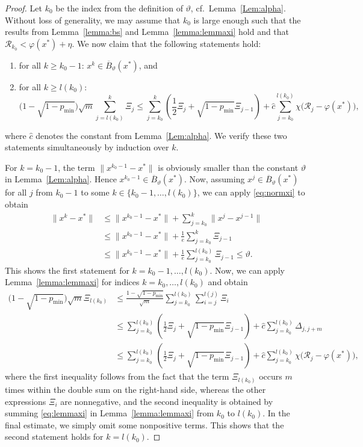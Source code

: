 \documentclass[a4paper, 12pt]{article}
\numberwithin{equation}{section}
\theoremstyle{bolddef}
\theoremstyle{definition}
\theoremstyle{boldplain}
\newcommand{\xk}{x^k}
\newcommand{\xj}{x^j}
\newcommand{\xjm}{x^{j-1}}
\newcommand{\pmin}{p_{\min}}
\newcommand{\Rvalue}{\mathcal{R}}
\newcommand{\clball}{\overline{B}}
\begin{document}
\begin{proof}
Let $k_0$ be the index from the definition of $\vartheta$, cf.\ Lemma~\ref{Lem:alpha}. Without loss of generality, we may assume that $k_0$ is large enough such that the results from Lemma~\ref{lemma:bs} and Lemma~\ref{lemma:lemmaxi} hold and that $\Rvalue_{k_0} < \varphi(x^*) + \eta$. We now claim that the following statements hold:
\begin{enumerate}[label=(\alph*)]
	\item for all $k \geq k_0-1$: $\xk \in \clball_\vartheta(x^*)$, and
	\item for all $k \geq l(k_0)$:
	\begin{equation}\label{eq:statementb}
	\big( 1-\sqrt{1-\pmin} \big) 
		\sqrt{m} \sum_{j = l(k_0)}^k \Xi_j \leq \sum_{j = k_0}^k \left(\frac{1}{2} \Xi_j + \sqrt{1-\pmin} \Xi_{j-1}\right) + \hat c \sum_{j = k_0}^{l(k_0)} \chi \big( \Rvalue_j - \varphi(x^*) \big),
	\end{equation}
\end{enumerate}
where $ \hat{c} $ denotes the constant from Lemma~\ref{Lem:alpha}.
We verify these two statements simultaneously by induction over $k$. 

For $k = k_0-1$, the term $\| x^{k_0-1} - x^* \|$ is obviously smaller than the constant $\vartheta$ in Lemma~\ref{Lem:alpha}. Hence $x^{k_0-1} \in \clball_\vartheta(x^*)$. Now, assuming $\xj \in \clball_\vartheta(x^*)$ for all $j$ from $k_0-1$ to some $k \in \{k_0-1, \dots, l(k_0)\}$, we can apply \eqref{eq:normxi} to obtain
\begin{align*}
	\|\xk - x^*\| &\leq \| x^{k_0-1} - x^* \| + \sum_{j = k_0}^{k} \| \xj - \xjm \|\\
	& \leq \| x^{k_0-1} - x^* \| + \frac{1}{e} \sum_{j = k_0}^{k} \Xi_{j-1}\\
	& \leq \| x^{k_0-1} - x^* \| + \frac{1}{e} \sum_{j = k_0}^{l(k_0)} \Xi_{j-1} \leq \vartheta.
\end{align*}
This shows the first statement for $k = k_0-1, \dots, l(k_0)$. Now, we can apply Lemma~\ref{lemma:lemmaxi} for indices $k = k_0, \dots, l(k_0)$ and obtain
\begin{align*}
   \big( 1-\sqrt{1-\pmin} \big)
   \sqrt{m} \Xi_{l(k_0)}& \leq \frac{1 - \sqrt{1- \pmin}}{\sqrt{m}} \sum_{j=k_0}^{l(k_0)} \sum_{i = j}^{l(j)} \Xi_i \\
	&\leq \sum_{j=k_0}^{l(k_0)} \left(\frac{1}{2} \Xi_j + \sqrt{1-p_{\min}} \Xi_{j-1}\right) + \hat c \sum_{j = k_0}^{l(k_0)} \Delta_{j, j+m}\\
	&\leq  \sum_{j=k_0}^{l(k_0)} \left(\frac{1}{2} \Xi_j + \sqrt{1-p_{\min}} \Xi_{j-1}\right) + \hat c \sum_{j = k_0}^{l(k_0)} 
	\chi \big( \Rvalue_j - \varphi(x^*) \big),
\end{align*}
where the first inequality follows from the fact that the term
$ \Xi_{l(k_0)} $ occurs $ m $ times within the double sum on the
right-hand side, whereas the other expressions $ \Xi_i $ are
nonnegative, and the second inequality is obtained by summing \eqref{eq:lemmaxi} in Lemma~\ref{lemma:lemmaxi} from $k_0$ to $l(k_0)$. 
In the final estimate, we simply omit some nonpositive terms.
This shows that the second statement holds for $k=l(k_0)$.


\end{proof}
\end{document}
